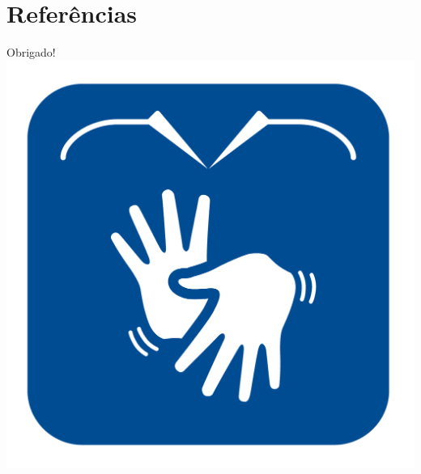 \documentclass[10pt]{beamer}
\theoremstyle{plain}
\theoremstyle{definition}
\begin{document}
	
	\section{Referências}
	\begin{frame}		
		
		{\footnotesize
		
		}
	\end{frame}
	
	\begin{frame}
		\begin{center}
			\vspace{1.5cm}
			Obrigado!\\
			\hspace{-4.5cm}
			\includegraphics[scale=0.2]{logo.png}
			

\end{center}
\end{frame}
\end{document}
